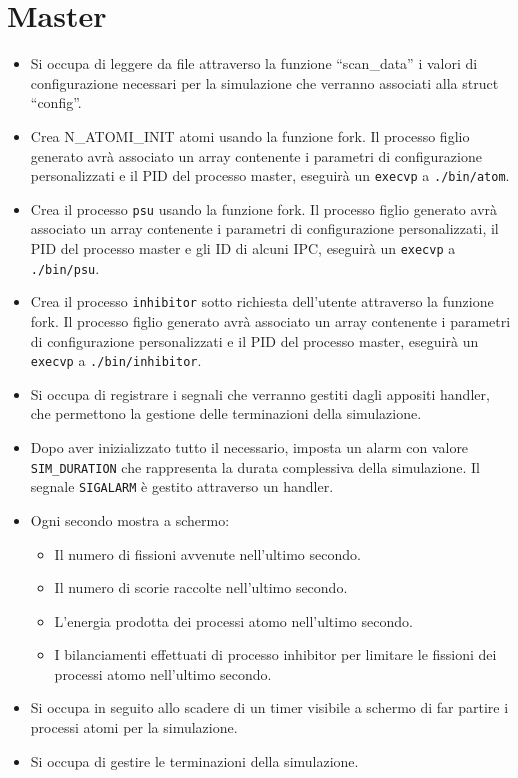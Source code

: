 \section{Master} 
\begin{itemize}
    \item Si occupa di leggere da file attraverso la funzione \enquote{scan\_data} i valori di configurazione necessari per la simulazione che verranno associati alla struct \enquote{config}. 
    \item Crea N\_ATOMI\_INIT atomi usando la funzione fork. Il processo figlio generato avrà associato un array contenente i parametri di configurazione personalizzati e il PID del processo master, eseguirà un \texttt{execvp} a \texttt{./bin/atom}.
    \item Crea il processo \texttt{psu} usando la funzione fork. Il processo figlio generato avrà associato un array contenente i parametri di configurazione personalizzati, il PID del processo master e gli ID di alcuni IPC, eseguirà un \texttt{execvp} a \texttt{./bin/psu}. 
    \item Crea il processo \texttt{inhibitor} sotto richiesta dell'utente attraverso la funzione fork. Il processo figlio generato avrà associato un array contenente i parametri di configurazione personalizzati e il PID del processo master, eseguirà un \texttt{execvp} a \texttt{./bin/inhibitor}.
    \item Si occupa di registrare i segnali che verranno gestiti dagli appositi handler, che permettono la gestione delle terminazioni della simulazione. 
    \item Dopo aver inizializzato tutto il necessario, imposta un alarm con valore \texttt{SIM\_DURATION} che rappresenta la durata complessiva della simulazione. Il segnale \texttt{SIGALARM} è gestito attraverso un handler.
    \item Ogni secondo mostra a schermo: 
    \begin{itemize}
        \item Il numero di fissioni avvenute nell'ultimo secondo. 
        \item Il numero di scorie raccolte nell'ultimo secondo.
        \item L'energia prodotta dei processi atomo nell'ultimo secondo.
        \item I bilanciamenti effettuati di processo inhibitor per limitare le fissioni dei processi atomo nell'ultimo secondo. 
    \end{itemize}
    \item Si occupa in seguito allo scadere di un timer visibile a schermo di far partire i processi atomi per la simulazione. 
    \item Si occupa di gestire le terminazioni della simulazione.
\end{itemize}
